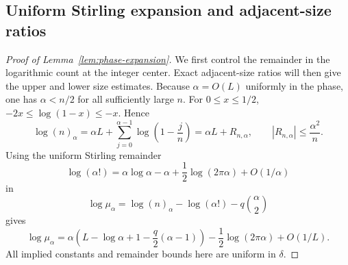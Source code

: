 \documentclass[a4paper,10pt,reqno]{amsart}
\numberwithin{equation}{section}
\theoremstyle{plain}
\theoremstyle{remark}
\begin{document}
\subsection{Uniform Stirling expansion and adjacent-size ratios}
\label{app:phase-expansion-details}

\begin{proof}[Proof of Lemma~\ref{lem:phase-expansion}]
We first control the remainder in the logarithmic count at the integer
center. Exact adjacent-size ratios will then give the upper and lower
size estimates. Because $\alpha=O(L)$ uniformly in the phase, one has
$\alpha<n/2$ for all sufficiently large $n$. For $0\le x\le1/2$,
$-2x\le\log(1-x)\le-x$. Hence
\[
  \log(n)_\alpha
  =\alpha L+\sum_{j=0}^{\alpha-1}\log\!\left(1-\frac jn\right)
  =\alpha L+R_{n,\alpha},
  \qquad
  |R_{n,\alpha}|\le\frac{\alpha^2}{n}.
\]
Using the uniform Stirling remainder
\[
  \log(\alpha!)
  =\alpha\log\alpha-\alpha
   +\frac12\log(2\pi\alpha)+O(1/\alpha)
\]
in
\[
  \log\mu_\alpha
  =\log(n)_\alpha-\log(\alpha!)-q\binom\alpha2
\]
gives
\begin{equation}
  \log\mu_\alpha
  =
  \alpha\left(
    L-\log\alpha+1-\frac q2(\alpha-1)
  \right)
  -\frac12\log(2\pi\alpha)
  +O(1/L).
  \label{eq:D-log-mu}
\end{equation}
All implied constants and remainder bounds here are uniform in $\delta$.


\end{proof}
\end{document}
